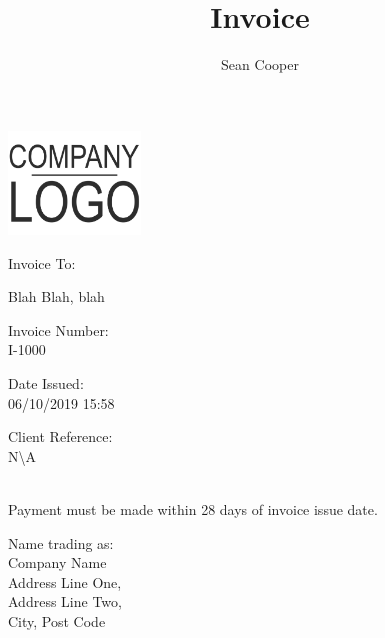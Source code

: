 \documentclass[11pt,a4paper]{letter}
\author{Sean Cooper}
\title{Invoice}
\begin{document}
    \begin{center}
        \includegraphics[width=100pt]{logo.png}
    \end{center}
    \vspace{18pt}
    \fontsize{7pt}{9pt}\selectfont
    \begin{minipage}[t]{0.6415\textwidth}
    {\semibold Invoice To:}
        \begin{flushleft}
            Blah
            Blah, blah
        \end{flushleft}
    \end{minipage}\hspace{12pt}
    \begin{minipage}[t]{0.1550\textwidth}
        \setlength{\parskip}{1em}
        {\semibold Invoice Number:}\\
        I-1000\par
        {\semibold Date Issued:}\\
        06/10/2019 15:58
    \end{minipage}\hspace{12pt}
    \begin{minipage}[t]{0.1350\textwidth}
    {\semibold Client Reference:}
        \\
        N\textbackslash A
    \end{minipage}
    \\
    \fontsize{7pt}{9pt}\selectfont
    {\semibold Payment must be made within 28 days of invoice issue date.}\par
    \vspace*{\fill}
    \begin{center}
    {\fontsize{7pt}{9pt}\selectfont
    Name trading as:\\
    {\semiboldit Company Name}\\
    Address Line One,\\
    Address Line Two,\\
    City, Post Code\\}
    \end{center}
\end{document}
